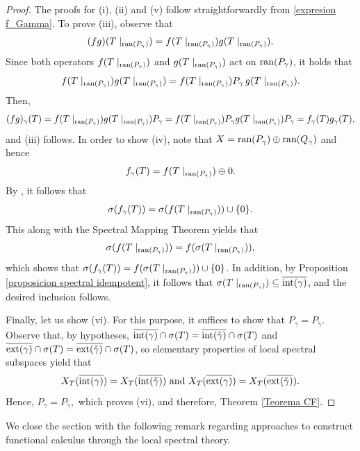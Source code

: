 \documentclass[11pt]{amsart}
\theoremstyle{definition}
\theoremstyle{remark}
\numberwithin{equation}{section}
\newcommand{\ran}{\textnormal{ran}}
\newcommand{\Xext}{X_T(\overline{\exte(\gamma)})}
\newcommand{\inte}{\textnormal{int}}
\newcommand{\exte}{\textnormal{ext}}
\begin{document}
	\begin{proof}
The proofs for (i), (ii) and (v) follow straightforwardly from \eqref{expresion f_Gamma}. To prove (iii), observe that
$$(fg)(T\mid_{\ran(P_\gamma)}) = f(T\mid_{\ran(P_\gamma)})g(T\mid_{\ran(P_\gamma)}).$$
Since both operators $f(T\mid_{\ran(P_\gamma)})$ and $g(T\mid_{\ran(P_\gamma)})$  act on $\ran(P_\gamma)$, it holds that
		$$
		f(T\mid_{\ran(P_\gamma)})g(T\mid_{\ran(P_\gamma)}) = f(T\mid_{\ran(P_\gamma)})P_\gamma \, g(T\mid_{\ran(P_\gamma)}).
		$$
		Then,
		$$
		(fg)_\gamma(T) = f(T\mid_{\ran(P_\gamma)})g(T\mid_{\ran(P_\gamma)})P_\gamma = f(T\mid_{\ran(P_\gamma)})P_\gamma g(T\mid_{\ran(P_\gamma)})P_\gamma = f_\gamma(T)g_\gamma(T),
		$$
		and (iii) follows. In order to show (iv), note that  $X= \ran(P_\gamma)\oplus \ran(Q_\gamma)$ and hence
		$$f_\gamma(T) = f(T\mid_{\ran(P_\gamma)})\oplus 0.$$
By \cite[Proposition 0.3, p. 9]{RR}, it follows that
		$$\sigma(f_\gamma(T)) = \sigma(f(T\mid_{\ran(P_\gamma)}))\cup \{0\}.$$
This along with the Spectral Mapping Theorem yields that
		$$
		\sigma(f(T\mid_{\ran(P_\gamma)})) = f(\sigma(T\mid_{\ran(P_\gamma)})),
		$$
		which shows that $\sigma(f_\gamma(T))= f(\sigma(T\mid_{\ran(P_\gamma)}))\cup\{0\}$.  In addition,  by Proposition \ref{proposicion spectral idempotent}, it follows that $  \sigma(T\mid_{\ran(P_\gamma)})\subseteq   \overline{\inte(\gamma)}$, and the desired inclusion follows.
		
\smallskip

Finally, let us show (vi). For this purpose, it suffices to show that $P_\gamma = P_{\tilde{\gamma}}$. Observe that, by hypotheses, $\overline{\inte(\gamma)} \cap \sigma(T) = \overline{\inte(\tilde{\gamma})}\cap \sigma(T)$ and $\overline{\exte(\gamma)} \cap \sigma(T) = \overline{\exte({\tilde{\gamma}})}\cap \sigma(T)$, so elementary properties of local spectral subspaces yield that
$$X_T(\overline{\inte(\gamma)}) = X_T(\overline{\inte(\tilde{\gamma})}) \mbox{ and } \Xext = X_T(\overline{\exte(\tilde{\gamma})}).$$
Hence, $P_\gamma = P_{\tilde{\gamma}},$ which proves (vi), and therefore, Theorem \ref{Teorema CF}.
\end{proof}

We close the section with the following remark regarding approaches to construct functional calculus through the local spectral theory.
\end{document}
